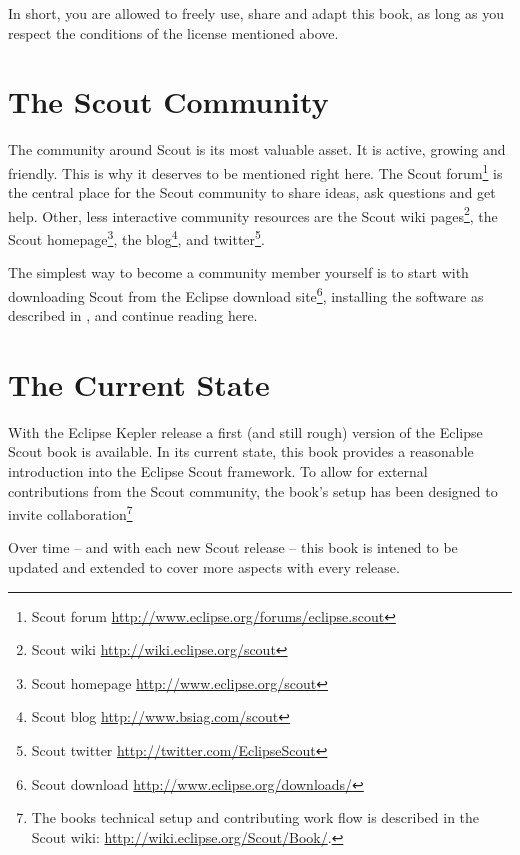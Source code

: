 \documentclass[a4paper,10pt,twoside]{book}
\begin{document}
\noindent In short, you are allowed to freely use, share and adapt this book, as long as you respect the conditions of the license mentioned above.

\newpage

\section*{The Scout Community}

The community around Scout is its most valuable asset.
It is active, growing and friendly.
This is why it deserves to be mentioned right here.
The Scout forum\footnote{Scout forum \url{http://www.eclipse.org/forums/eclipse.scout}} is the central place for the Scout community to share ideas, ask questions and get help. 
Other, less interactive community resources are the Scout wiki 
pages\footnote{Scout wiki \url{http://wiki.eclipse.org/scout}}, the Scout 
homepage\footnote{Scout homepage \url{http://www.eclipse.org/scout}}, 
the blog\footnote{Scout blog \url{http://www.bsiag.com/scout}}, and 
twitter\footnote{Scout twitter \url{http://twitter.com/EclipseScout}}.

The simplest way to become a community member yourself is to start with downloading
Scout from the Eclipse download site\footnote{Scout download \url{http://www.eclipse.org/downloads/}}, 
installing the software as described in , and continue reading here.

\section*{The Current State}

With the Eclipse Kepler release a first (and still rough) version of the Eclipse Scout book is available. 
In its current state, this book provides a reasonable introduction into the Eclipse Scout framework. 
To allow for external contributions from the Scout community, the book's setup has been designed to invite collaboration\footnote{
The books technical setup and contributing work flow is described in the Scout wiki: \url{http://wiki.eclipse.org/Scout/Book/}.
} 

Over time -- and with each new Scout release -- this book is intened to be updated and extended to cover more aspects with every release.

\end{document}
